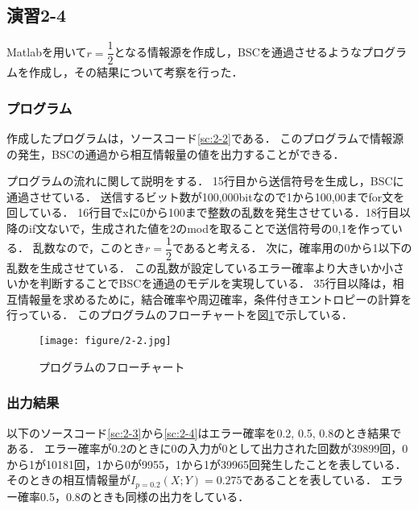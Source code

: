 \documentclass[documentclass]{jsarticle}
\begin{document}
\subsection*{演習2-4}
Matlabを用いて$r = \dfrac{1}{2}$となる情報源を作成し，BSCを通過させるようなプログラムを作成し，その結果について考察を行った．

\subsubsection*{プログラム}
作成したプログラムは，ソースコード\ref*{sc:2-2}である．
このプログラムで情報源の発生，BSCの通過から相互情報量の値を出力することができる．

プログラムの流れに関して説明をする．
15行目から送信符号を生成し，BSCに通過させている．
送信するビット数が100,000bitなので1から100,00までfor文を回している．
16行目でxに0から100まで整数の乱数を発生させている．18行目以降のif文ないで，生成された値を2のmodを取ることで送信符号の0,1を作っている．
乱数なので，このとき$r = \dfrac{1}{2}$であると考える．
次に，確率用の0から1以下の乱数を生成させている．
この乱数が設定しているエラー確率より大きいか小さいかを判断することでBSCを通過のモデルを実現している．
35行目以降は，相互情報量を求めるために，結合確率や周辺確率，条件付きエントロピーの計算を行っている．
このプログラムのフローチャートを図\ref*{fig:2-3}で示している．



\begin{figure}[H]
  \begin{center}
    \texttt{[image: figure/2-2.jpg]}
  \end{center}
  \caption{プログラムのフローチャート}
  \label{fig:2-3}
\end{figure}


\subsubsection*{出力結果}
以下のソースコード\ref*{sc:2-3}から\ref*{sc:2-4}はエラー確率を0.2, 0.5, 0.8のとき結果である．
エラー確率が0.2のときに0の入力が0として出力された回数が39899回，0から1が10181回，1から0が9955，1から1が39965回発生したことを表している．
そのときの相互情報量が$I_{p=0.2}(X;Y)=0.275$であることを表している．
エラー確率0.5，0.8のときも同様の出力をしている．



\end{document}
